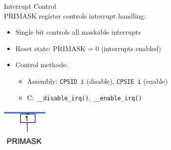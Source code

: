 \begin{definition}{Interrupt Control}\\
PRIMASK register controls interrupt handling:
\begin{itemize}
  \item Single bit controls all maskable interrupts
  \item Reset state: PRIMASK = 0 (interrupts enabled)
  \item Control methods:
    \begin{itemize}
      \item Assembly: \texttt{CPSID i} (disable), \texttt{CPSIE i} (enable)
      \item C: \texttt{\_\_disable\_irq()}, \texttt{\_\_enable\_irq()}
    \end{itemize}
\end{itemize}

\includegraphics[width=\linewidth]{images/2024_12_29_79e6b22f503fb7b4f718g-11}
\end{definition}

